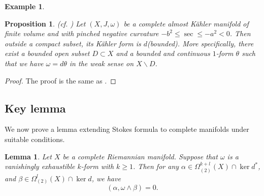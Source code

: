 \documentclass[12pt, twoside]{article}
\newtheorem{lemma}[theorem]{Lemma}
\newtheorem{proposition}[theorem]{Proposition}
\theoremstyle{definition}
\newtheorem{example}[theorem]{Example}
\numberwithin{equation}{section}
\def \a {\alpha }
\def \b {\beta}
\def\w {\omega}
\def\Om{\Omega}
\begin{document}
\begin{example}
		\begin{proposition}(cf. \cite[Lemma 3.2]{Yeg})
			Let $(X,J,\w)$ be a complete almost K\"{a}hler manifold of finite volume and with pinched negative curvature $-b^{2}\leq \sec\leq -a^{2}<0$. 
			Then outside a compact subset, its K\"{a}hler form is $d$(bounded). 
			More specifically, there exist a bounded open subset $D\subset X$ and a bounded and continuous $1$-form $\theta$ 
			such that we have  $\w=d\theta$ in the weak sense on $X\backslash D$. 
		\end{proposition}
	\begin{proof}
	The proof is the same as \cite[Lemma 3.2]{Yeg}.
\end{proof}
	\end{example}



	\subsection{Key lemma}
We now prove a lemma extending Stokes formula to complete manifolds under suitable conditions.
	\begin{lemma}\label{L8}
		Let  $X$ be a complete Riemannian manifold. Suppose that $\w$ is a vanishingly exhaustible $k$-form with $k\geq1$. Then for any $\a\in\Om^{k+l}_{(2)}(X)\cap\ker d^{\ast}$, and $\b\in\Om^{l}_{(2)}(X)\cap\ker d$, we have
		\begin{equation*}
		(\a, \w\wedge \b)=0.
		\end{equation*}
	\end{lemma}
\end{document}
